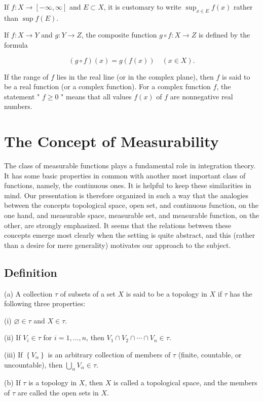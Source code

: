 \documentclass[10pt]{article}
\begin{document}
If $f: X \rightarrow[-\infty, \infty]$ and $E \subset X$, it is customary to write $\sup _{x \in E} f(x)$ rather than $\sup f(E)$.

If $f: X \rightarrow Y$ and $g: Y \rightarrow Z$, the composite function $g \circ f: X \rightarrow Z$ is defined by the formula

$$
(g \circ f)(x)=g(f(x)) \quad(x \in X) .
$$

If the range of $f$ lies in the real line (or in the complex plane), then $f$ is said to be a real function (or a complex function). For a complex function $f$, the statement " $f \geq 0$ " means that all values $f(x)$ of $f$ are nonnegative real numbers.

\section{The Concept of Measurability}
The class of measurable functions plays a fundamental role in integration theory. It has some basic properties in common with another most important class of functions, namely, the continuous ones. It is helpful to keep these similarities in mind. Our presentation is therefore organized in such a way that the analogies between the concepts topological space, open set, and continuous function, on the one hand, and measurable space, measurable set, and measurable function, on the other, are strongly emphasized. It seems that the relations between these concepts emerge most clearly when the setting is quite abstract, and this (rather than a desire for mere generality) motivates our approach to the subject.

\subsection{Definition}
(a) A collection $\tau$ of subsets of a set $X$ is said to be a topology in $X$ if $\tau$ has the following three properties:

(i) $\varnothing \in \tau$ and $X \in \tau$.

(ii) If $V_{i} \in \tau$ for $i=1, \ldots, n$, then $V_{1} \cap V_{2} \cap \cdots \cap V_{n} \in \tau$.

(iii) If $\left\{V_{\alpha}\right\}$ is an arbitrary collection of members of $\tau$ (finite, countable, or uncountable), then $\bigcup_{\alpha} V_{\alpha} \in \tau$.

(b) If $\tau$ is a topology in $X$, then $X$ is called a topological space, and the members of $\tau$ are called the open sets in $X$.
\end{document}

